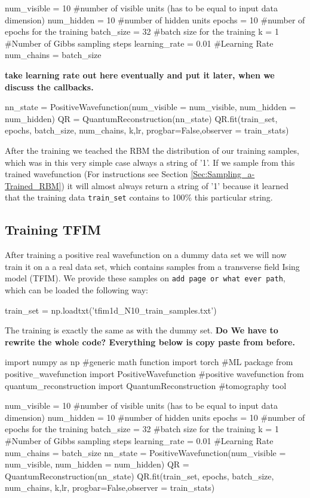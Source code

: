 \documentclass[submission, Phys]{SciPost}
\begin{document}
\begin{python}
num_visible = 10 #number of visible units (has to be equal to input data dimension)
num_hidden = 10 #number of hidden units
epochs = 10 #number of epochs for the training
batch_size = 32 #batch size for the training
k = 1 #Number of Gibbs sampling steps
learning_rate = 0.01 #Learning Rate
num_chains = batch_size
\end{python}

\textbf{take learning rate out here eventually and put it later, when we discuss the callbacks.}

\begin{python}
nn_state = PositiveWavefunction(num_visible = num_visible,
						                    num_hidden = num_hidden)
QR = QuantumReconstruction(nn_state)
QR.fit(train_set, epochs, batch_size, num_chains, k,lr, progbar=False,observer = train_stats)
\end{python}

After the training we teached the RBM the distribution of our training samples, which was in this very simple case always a string of '1'. If we sample from this trained wavefunction (For instructions see Section \ref{Sec:Sampling_a-Trained_RBM}) it will almost always return a string of '1' because it learned that the training data \verb|train_set| contains to 100\% this particular string.

\subsection{Training TFIM}
\label{Sec:Training_TFIM}

After training a positive real wavefunction on a dummy data set we will now train it on a a real data set, which contains samples from a transverse field Ising model (TFIM). We provide these samples on \verb|add page or what ever path|, which can be loaded the following way:

\begin{python}
train_set =  np.loadtxt('tfim1d_N10_train_samples.txt')
\end{python}

The training is exactly the same as with the dummy set. \textbf{Do We have to rewrite the whole code? Everything below is copy paste from before.}

\begin{python}
import numpy as np 		#generic math function
import torch 			#ML package
from positive_wavefunction import PositiveWavefunction #positive wavefunction
from quantum_reconstruction import QuantumReconstruction #tomography tool

num_visible = 10 #number of visible units (has to be equal to input data dimension)
num_hidden = 10 #number of hidden units
epochs = 10 #number of epochs for the training
batch_size = 32 #batch size for the training
k = 1 #Number of Gibbs sampling steps
learning_rate = 0.01 #Learning Rate
num_chains = batch_size
nn_state = PositiveWavefunction(num_visible = num_visible,
						                    num_hidden = num_hidden)
QR = QuantumReconstruction(nn_state)
QR.fit(train_set, epochs, batch_size, num_chains, k,lr, progbar=False,observer = train_stats)
\end{python}
\end{document}
